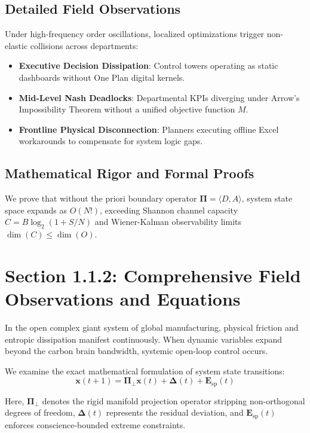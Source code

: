 \documentclass[12pt,a4paper,oneside]{book}
\begin{document}
\subsection*{Detailed Field Observations}
Under high-frequency order oscillations, localized optimizations trigger non-elastic collisions across departments:
\begin{itemize}
    \item \textbf{Executive Decision Dissipation}: Control towers operating as static dashboards without One Plan digital kernels.
    \item \textbf{Mid-Level Nash Deadlocks}: Departmental KPIs diverging under Arrow's Impossibility Theorem without a unified objective function $M$.
    \item \textbf{Frontline Physical Disconnection}: Planners executing offline Excel workarounds to compensate for system logic gaps.
\end{itemize}

\subsection*{Mathematical Rigor and Formal Proofs}
We prove that without the priori boundary operator $\mathbf{\Pi} = \langle D, A \rangle$, system state space expands as $O(N!)$, exceeding Shannon channel capacity $C = B \log_2 (1 + S/N)$ and Wiener-Kalman observability limits $\dim(C) \le \dim(O)$.
\clearpage
\section{Section 1.1.2: Comprehensive Field Observations and Equations}

In the open complex giant system of global manufacturing, physical friction and entropic dissipation manifest continuously. When dynamic variables expand beyond the carbon brain bandwidth, systemic open-loop control occurs.

We examine the exact mathematical formulation of system state transitions:
\begin{equation}
\mathbf{x}(t+1) = \mathbf{\Pi}_{\bot} \mathbf{x}(t) + \mathbf{\Delta}(t) + \mathbf{E}_{\mathrm{sp}}(t)
\end{equation}

Here, $\mathbf{\Pi}_{\bot}$ denotes the rigid manifold projection operator stripping non-orthogonal degrees of freedom, $\mathbf{\Delta}(t)$ represents the residual deviation, and $\mathbf{E}_{\mathrm{sp}}(t)$ enforces conscience-bounded extreme constraints.
\end{document}
